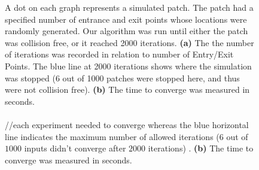 \begin{figure}[t]
\caption{ A dot on each graph represents a simulated patch. The patch had a specified number of entrance and exit points whose locations were randomly generated. Our algorithm was run until either the patch was collision free, or it reached 2000 iterations.  \textbf{(a)} The the number of iterations was recorded in relation to number of Entry/Exit Points. The blue line at 2000 iterations shows where the simulation was stopped (6 out of 1000 patches were stopped here, and thus were not collision free). \textbf{(b)} The time to converge was measured in seconds.  \\\\ //each experiment needed to converge whereas the blue horizontal line indicates the maximum number of allowed iterations ($6$  out of $1000$ inputs  didn't converge after $2000$ iterations) . \textbf{(b)} The time to converge was measured in seconds.   }
\label{fig:res:graphs}
\end{figure}


